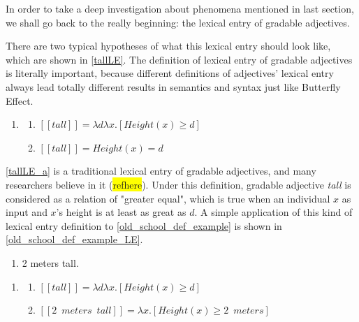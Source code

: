 \documentclass{ctexart}
\begin{document}
In order to take a deep investigation about phenomena mentioned in last section, we shall go back to the really beginning: the lexical entry of gradable adjectives. 

There are two typical hypotheses of what this lexical entry should look like, which are shown in \ref{tallLE}. The definition of lexical entry of gradable adjectives is literally important, because different definitions of adjectives' lexical entry always lead totally different results in semantics and syntax just like Butterfly Effect.

\begin{enumerate}[resume]
    \item \label{tallLE}
    
    \begin{enumerate}[ref=(\arabic{enumi}\alph*)]
        \item \label{tallLE_a} 
        $[\![tall]\!]=\lambda d \lambda x.[Height(x) \geq d]$
    
        \item \label{tallLE_b} 
        $[\![tall]\!]=Height(x)=d$
    
    \end{enumerate}
\end{enumerate}

\ref{tallLE_a} is a traditional lexical entry of gradable adjectives, and many researchers believe in it (\colorbox{yellow}{refhere}). Under this definition, gradable adjective \textit{tall} is considered as a relation of "greater equal", which is true when an individual $x$ as input and $x$'s height is at least as great as $d$. A simple application of this kind of lexical entry definition to \ref{old_school_def_example} is shown in \ref{old_school_def_example_LE}.

\begin{enumerate}[resume]

    \item \label{old_school_def_example} 2 meters tall.

\end{enumerate}

\begin{enumerate}[resume]

    \item \label{old_school_def_example_LE}
    
    \begin{enumerate}[ref=(\arabic{enumi}\alph*)]
        
        \item $[\![tall]\!]=\lambda d \lambda x.[Height(x) \geq d]$
        \item $[\![2 \enspace meters \enspace tall]\!]=\lambda x.[Height(x) \geq 2 \enspace meters]$

    \end{enumerate}

\end{enumerate}
\end{document}
